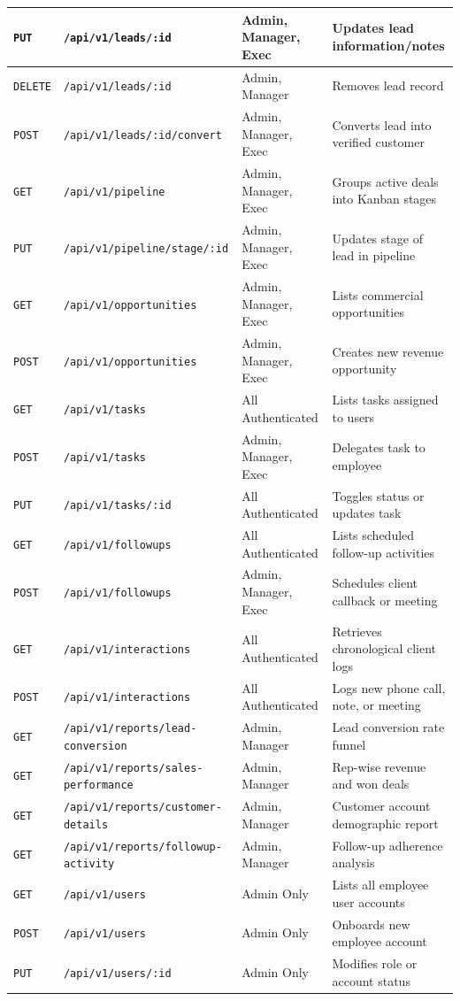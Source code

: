 \begin{table}[h!]
\begin{tabular}{|p{1.5cm}|p{5.5cm}|p{3.5cm}|p{4cm}|}
\texttt{PUT} & \texttt{/api/v1/leads/:id} & Admin, Manager, Exec & Updates lead information/notes \\ \hline
\texttt{DELETE}& \texttt{/api/v1/leads/:id} & Admin, Manager & Removes lead record \\ \hline
\texttt{POST} & \texttt{/api/v1/leads/:id/convert} & Admin, Manager, Exec & Converts lead into verified customer \\ \hline
\texttt{GET} & \texttt{/api/v1/pipeline} & Admin, Manager, Exec & Groups active deals into Kanban stages \\ \hline
\texttt{PUT} & \texttt{/api/v1/pipeline/stage/:id}& Admin, Manager, Exec & Updates stage of lead in pipeline \\ \hline
\texttt{GET} & \texttt{/api/v1/opportunities} & Admin, Manager, Exec & Lists commercial opportunities \\ \hline
\texttt{POST} & \texttt{/api/v1/opportunities} & Admin, Manager, Exec & Creates new revenue opportunity \\ \hline
\texttt{GET} & \texttt{/api/v1/tasks} & All Authenticated & Lists tasks assigned to users \\ \hline
\texttt{POST} & \texttt{/api/v1/tasks} & Admin, Manager, Exec & Delegates task to employee \\ \hline
\texttt{PUT} & \texttt{/api/v1/tasks/:id} & All Authenticated & Toggles status or updates task \\ \hline
\texttt{GET} & \texttt{/api/v1/followups} & All Authenticated & Lists scheduled follow-up activities \\ \hline
\texttt{POST} & \texttt{/api/v1/followups} & Admin, Manager, Exec & Schedules client callback or meeting \\ \hline
\texttt{GET} & \texttt{/api/v1/interactions} & All Authenticated & Retrieves chronological client logs \\ \hline
\texttt{POST} & \texttt{/api/v1/interactions} & All Authenticated & Logs new phone call, note, or meeting \\ \hline
\texttt{GET} & \texttt{/api/v1/reports/lead-conversion} & Admin, Manager & Lead conversion rate funnel \\ \hline
\texttt{GET} & \texttt{/api/v1/reports/sales-performance}& Admin, Manager & Rep-wise revenue and won deals \\ \hline
\texttt{GET} & \texttt{/api/v1/reports/customer-details} & Admin, Manager & Customer account demographic report \\ \hline
\texttt{GET} & \texttt{/api/v1/reports/followup-activity} & Admin, Manager & Follow-up adherence analysis \\ \hline
\texttt{GET} & \texttt{/api/v1/users} & Admin Only & Lists all employee user accounts \\ \hline
\texttt{POST} & \texttt{/api/v1/users} & Admin Only & Onboards new employee account \\ \hline
\texttt{PUT} & \texttt{/api/v1/users/:id} & Admin Only & Modifies role or account status \\ \hline
\end{tabular}
\end{table}

